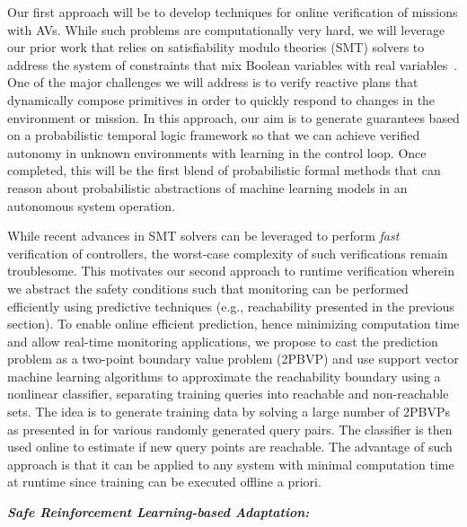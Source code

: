  Our first approach will be to develop techniques for online verification of missions with AVs. While such problems are computationally very hard, we will leverage our prior work that relies on satisfiability modulo theories (SMT) solvers to address the system of constraints that mix Boolean variables with real variables~\cite{cdc15, roslab}. One of the major challenges we will address is to verify reactive plans that dynamically compose primitives in order to quickly respond to changes in the environment or mission.  In this approach, our aim is to generate guarantees based on a probabilistic temporal logic framework so that we can achieve verified autonomy in unknown environments with learning in the control loop.  Once completed, this will be the first blend of probabilistic formal methods that can reason about probabilistic abstractions of machine learning models in an autonomous system operation.  

While recent advances in SMT solvers can be leveraged to perform \emph{fast} verification of controllers, the worst-case complexity of such verifications remain troublesome.  This motivates our second approach to runtime verification wherein we abstract the safety conditions such that monitoring can be performed efficiently using predictive techniques (e.g., reachability presented in the previous section). To enable online efficient prediction, hence minimizing computation time and allow real-time monitoring applications, we propose to cast the prediction problem as a two-point boundary value problem (2PBVP) \cite{allen2014machine} and use support vector machine learning algorithms to approximate the reachability boundary using a nonlinear classifier, separating training queries into reachable and non-reachable sets. The idea is to generate training data by solving a large number of 2PBVPs as presented in \cite{allen2014machine} for various randomly generated query pairs. The classifier is then used online to estimate if new query points are reachable. The advantage of such approach is that it can be applied to any system with minimal computation time at runtime since training can be executed offline a priori. 




\noindent\textbf{\em Safe Reinforcement Learning-based Adaptation:} 


